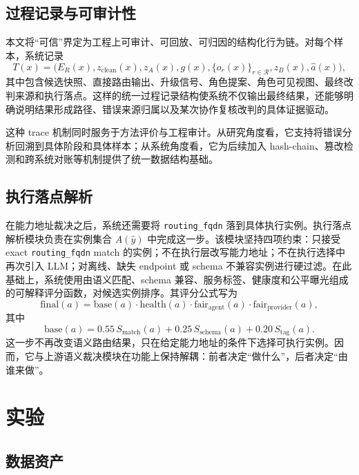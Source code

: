 \documentclass[11pt,a4paper]{ctexart}
\begin{document}
\subsection{过程记录与可审计性}

本文将“可信”界定为工程上可审计、可回放、可归因的结构化行为链。对每个样本，系统记录
\begin{equation}
T(x)=\bigl(E_R(x), z_{\mathrm{clean}}(x), z_A(x), g(x), \{o_r(x)\}_{r\in\mathcal{R}}, z_B(x), \hat a(x)\bigr),
\end{equation}
其中包含候选快照、直接路由输出、升级信号、角色提案、角色可见视图、最终改判来源和执行落点。这样的统一过程记录结构使系统不仅输出最终结果，还能够明确说明结果形成路径、错误来源归属以及某次协作复核改判的具体证据驱动。

这种 trace 机制同时服务于方法评价与工程审计。从研究角度看，它支持将错误分析回溯到具体阶段和具体样本；从系统角度看，它为后续加入 hash-chain、篡改检测和跨系统对账等机制提供了统一数据结构基础。

\subsection{执行落点解析}

在能力地址裁决之后，系统还需要将 \texttt{routing\_fqdn} 落到具体执行实例。执行落点解析模块负责在实例集合 $A(\hat y)$ 中完成这一步。该模块坚持四项约束：只接受 exact \texttt{routing\_fqdn} match 的实例；不在执行层改写能力地址；不在执行选择中再次引入 LLM；对离线、缺失 endpoint 或 schema 不兼容实例进行硬过滤。在此基础上，系统使用由语义匹配、schema 兼容、服务标签、健康度和公平曝光组成的可解释评分函数，对候选实例排序。其评分公式写为
\begin{equation}
\text{final}(a)=\text{base}(a)\cdot \text{health}(a)\cdot \text{fair}_{\text{agent}}(a)\cdot \text{fair}_{\text{provider}}(a),
\end{equation}
其中
\begin{equation}
\text{base}(a)=0.55\,S_{\text{match}}(a)+0.25\,S_{\text{schema}}(a)+0.20\,S_{\text{tag}}(a).
\end{equation}
这一步不再改变语义路由结果，只在给定能力地址的条件下选择可执行实例。因而，它与上游语义裁决模块在功能上保持解耦：前者决定“做什么”，后者决定“由谁来做”。

\section{实验}

\subsection{数据资产}
\end{document}

